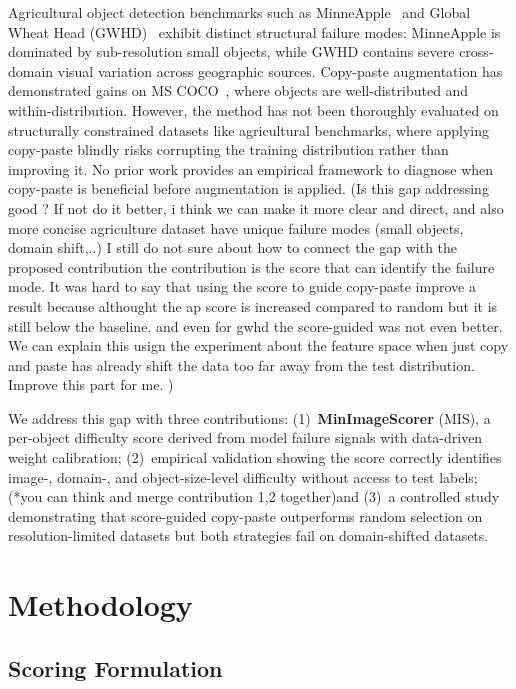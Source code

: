 \documentclass[conference]{IEEEtran}
\begin{document}
Agricultural object detection benchmarks such as
MinneApple~\cite{hani2020minneapple} and Global Wheat Head
(GWHD)~\cite{david2021global} exhibit distinct structural failure
modes: MinneApple is dominated by sub-resolution small objects, while
GWHD contains severe cross-domain visual variation across geographic
sources. Copy-paste augmentation has demonstrated gains on MS
COCO~\cite{kisantal2019augmentation, ghiasi2021simple}, where objects
are well-distributed and within-distribution. However, the method has
not been thoroughly evaluated on structurally constrained datasets like
agricultural benchmarks, where applying copy-paste blindly risks
corrupting the training distribution rather than improving it. No prior
work provides an empirical framework to diagnose when copy-paste is
beneficial before augmentation is applied. 
(Is this gap addressing good ?
If not do it better, i think we can make it more clear and direct, and also more concise
agriculture dataset have unique failure modes (small objects, domain shift,..) 
I still do not sure about how to connect the gap with the proposed contribution
the contribution is the score that can identify the failure mode.
It was hard to say that using the score to guide copy-paste improve a result
because althought the ap score is increased compared to random but 
it is still below the baseline. and even for gwhd the score-guided was not even better.
We can explain this usign the experiment about the feature space
when just copy and paste has already shift the data too far away from 
the test distribution.
Improve this part for me.
)



We address this gap with three contributions: (1)~\textbf{MinImageScorer}
(MIS), a per-object difficulty score derived from model failure signals
with data-driven weight calibration; (2)~empirical validation showing
the score correctly identifies image-, domain-, and object-size-level
difficulty without access to test labels; (*you can 
think and merge contribution 1,2 together)and (3)~a controlled study
demonstrating that score-guided copy-paste outperforms random selection
on resolution-limited datasets but both strategies fail on
domain-shifted datasets.

\section{Methodology}

\subsection{Scoring Formulation}
\end{document}
